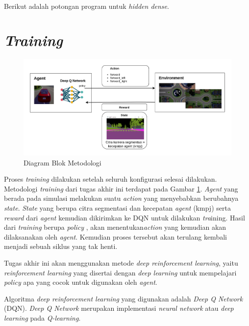 Berikut adalah potongan program untuk \textit{hidden dense}.



\section{\textit{Training}}
\label{sec:training}

\begin{figure}[H] 
	\centering
	\includegraphics[width=1\linewidth]{images/metodologi}
	\caption{Diagram Blok Metodologi}
	\label{fig:blockdiagram}
\end{figure}

Proses \textit{training} dilakukan setelah seluruh konfigurasi selesai dilakukan. Metodologi \textit{training} dari tugas akhir ini terdapat pada Gambar \ref{fig:blockdiagram}. \textit{Agent} yang berada pada simulasi melakukan suatu \textit{action} yang menyebabkan berubahnya \textit{state}. \textit{State} yang berupa citra segmentasi dan kecepatan \textit{agent} (kmpj) serta \textit{reward }dari \textit{agent} kemudian dikirimkan ke DQN untuk dilakukan \textit{tra}ining. Hasil dari \textit{training} berupa \textit{policy },  akan menentukan\textit{action} yang kemudian akan dilaksanakan oleh \textit{agent}. Kemudian proses tersebut akan terulang kembali menjadi sebuah siklus yang tak henti.

\iffalse
Tugas akhir ini akan menggunakan metode \textit{deep reinforcement learning}, yaitu \textit{reinforcement learning }yang disertai dengan \textit{deep learning }untuk mempelajari \textit{policy }apa yang cocok untuk digunakan oleh \textit{agent}. 

Algoritma \textit{deep reinforcement learning} yang digunakan adalah \textit{Deep Q Network} (DQN). \textit{Deep Q Network} merupakan implementasi \textit{neural network} atau \textit{deep learning} pada \textit{Q-learning}.

